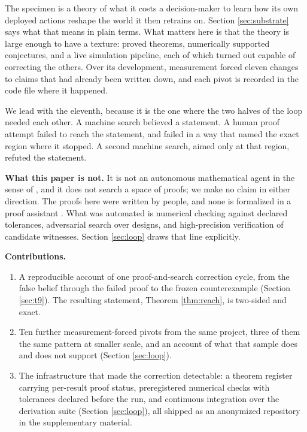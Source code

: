 \documentclass{article}
\begin{document}
The specimen is a theory of what it costs a decision-maker to learn how its
own deployed actions reshape the world it then retrains on. Section
\ref{sec:substrate} says what that means in plain terms. What matters here is
that the theory is large enough to have a texture: proved theorems,
numerically supported conjectures, and a live simulation pipeline, each of
which turned out capable of correcting the others. Over its development,
measurement forced eleven changes to claims that had already been written
down, and each pivot is recorded in the code file where it happened.

We lead with the eleventh, because it is the one where the two halves of the
loop needed each other. A machine search believed a statement. A human proof
attempt failed to reach the statement, and failed in a way that named the
exact region where it stopped. A second machine search, aimed only at that
region, refuted the statement.

\textbf{What this paper is not.} It is not an autonomous mathematical agent in
the sense of \citet{hubert2025olympiad}, and it does not search a space of
proofs; we make no claim in either direction. The proofs here were written by
people, and none is formalized in a proof assistant \citep{mathlib2020}. What was automated is numerical checking against declared tolerances,
adversarial search over designs, and high-precision verification of candidate
witnesses. Section \ref{sec:loop} draws that line explicitly.

\textbf{Contributions.}
\begin{enumerate}\itemsep1pt
\item A reproducible account of one proof-and-search correction cycle, from
the false belief through the failed proof to the frozen counterexample
(Section \ref{sec:t9}). The resulting statement, Theorem \ref{thm:reach}, is
two-sided and exact.
\item Ten further measurement-forced pivots from the same project, three of
them the same pattern at smaller scale, and an account of what that sample
does and does not support (Section \ref{sec:loop}).
\item The infrastructure that made the correction detectable: a theorem
register carrying per-result proof status, preregistered numerical checks
with tolerances declared before the run, and continuous integration over the
derivation suite (Section \ref{sec:loop}), all shipped as an anonymized
repository in the supplementary material.
\end{enumerate}
\end{document}
